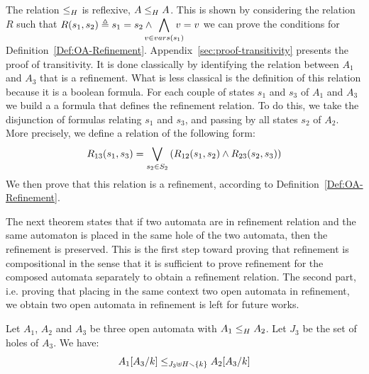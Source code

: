 \documentclass[runningheads]{llncs}
\begin{document}
The relation  \(\wrel{}{}{H}\) is reflexive,  \(\wrel{A}{A}{H}\). This is shown  by considering the relation $R$ such that $R\mpar{s_1, s_2} \triangleq s_1=s_2\land \displaystyle\bigwedge_\subbox{v \in vars(s_1)} {v=v}$   we can prove the conditions for Definition~\ref{Def:OA-Refinement}.
%
Appendix~\ref{sec:proof-transitivity} presents the proof of transitivity. It is done classically by identifying the relation between $A_1$ and $A_3$ that is a refinement. What is less classical is the definition of this relation because it is a boolean formula. For each couple of states  $s_1$ and $s_3$ of $A_1$ and $A_3$ we build a a formula that defines the refinement relation. To do this, we take the disjunction of formulas relating $s_1$ and $s_3$, and passing by all states $s_2$ of $A_2$. More precisely, we define a relation of the following form:
  \[R_{13}(s_1,s_3)=\bigvee_{s_2\in S_2}\mpar{R_{12}(s_1,s_2) \land R_{23}(s_2,s_3) } \]
We then prove that this relation  is a refinement, according to Definition~\ref{Def:OA-Refinement}.


The next  theorem states that if two automata are in refinement relation and the same automaton is placed in the same hole of the two automata, then the refinement is preserved. This is the first step toward proving that
 refinement is compositional in the sense that it is sufficient to prove refinement for the composed automata separately to obtain a refinement relation.
The second part, i.e. proving that placing in the same context two open automata in refinement, we obtain two open automata in refinement is left for future works.
%
%

\begin{theorem}\label{thm:ContextRefinement}
Let $A_1$, $A_2$ and $A_3$ be three open automata with $\wrel{A_1}{A_2}{H}$. 
Let $J_3$ be the set of holes of $A_3$.
We have: \[\wrel{A_1\subst{A_3}{k}}{A_2\subst{A_3}{k}}{J_3 \uplus H \setminus \mbrc{k}}\]
\end{theorem}
\end{document}
